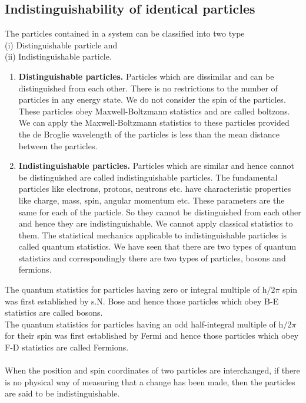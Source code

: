 \subsection{Indistinguishability of identical particles}
The particles contained in a system can be classified into two type\\
(i) Distinguishable particle and \\(ii) Indistinguishable particle.
\begin{enumerate}[label=\roman*)]
	\item \textbf{ Distinguishable particles.} Particles which are dissimilar and can be distinguished from each other. There is no restrictions to the number of particles in any energy state. We do not consider the spin of the particles. These particles obey Maxwell-Boltzmann statistics and are called boltzons. We can apply the Maxwell-Boltzmann statistics to these particles provided the de Broglie wavelength of the particles is less than the mean distance between the particles.
	\item \textbf{Indistinguishable particles.} Particles which are similar and hence cannot be distinguished are called indistinguishable particles. The fundamental particles like electrons, protons, neutrons etc. have characteristic properties like charge, mass, spin, angular momentum etc. These parameters are the same for each of the particle. So they cannot be distinguished from each other and hence they are indistinguishable. We cannot apply classical statistics to them. The statistical mechanics applicable to indistinguishable particles is called quantum statistics. We have seen that there are two types of quantum statistics and correspondingly there are two types of particles, bosons and fermions.
\end{enumerate} 
\par The quantum statistics for particles having zero or integral multiple of $\mathrm{h} / 2 \pi$ spin was first established by s.N. Bose and hence those particles which obey B-E statistics are called bosons.\\
The quantum statistics for particles having an odd half-integral multiple of $\mathrm{h} / 2 \pi$ for their spin was first established by Fermi and hence those particles which obey F-D statistics are called Fermions.\\\\
When the position and spin coordinates of two particles are interchanged, if there is no physical way of measuring that a change has been made, then the particles are said to be indistinguishable.
